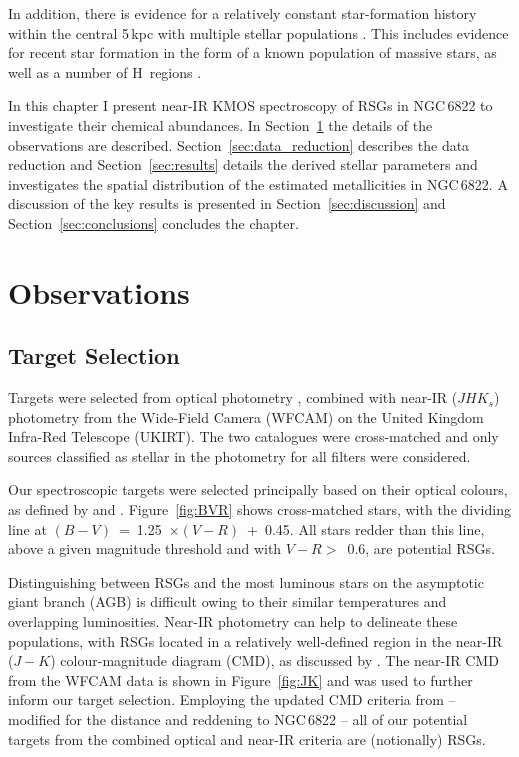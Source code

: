In addition, there is evidence for a relatively constant star-formation history within the central 5\,kpc
\citep{2014ApJ...789..147W}
with multiple stellar populations
\citep{2006A&A...451...99B,2012A&A...540A.135S}.
This includes evidence for recent star formation in the form of a known population of massive stars, as well as a number of H\,\2 regions
\citep{2001ApJ...547..765V,2006AJ....131..343D,2009A&A...505.1027H,2012AJ....144....2L}.

In this chapter I present near-IR KMOS spectroscopy of RSGs in NGC\,6822 to investigate their chemical abundances.
In Section~\ref{sec:observations} the details of the observations are described.
Section~\ref{sec:data_reduction} describes the data reduction and
Section~\ref{sec:results} details the derived stellar parameters and investigates the spatial distribution of the estimated metallicities in NGC\,6822.
A discussion of the key results is presented in Section~\ref{sec:discussion} and
Section~\ref{sec:conclusions} concludes the chapter.


\section{Observations}
\label{sec:observations}

\subsection{Target Selection} %
\label{sub:target_selection}

Targets were selected from optical photometry
\citep{2007AJ....134.2474M}, combined with near-IR ($JHK{_s}$) photometry
\cite[for details see][]{2012A&A...540A.135S} from the Wide-Field Camera (WFCAM) on the United Kingdom Infra-Red Telescope (UKIRT).
The two catalogues were cross-matched and only sources classified as stellar in the photometry for all filters were considered.

Our spectroscopic targets were selected principally based on their optical colours, as defined by
\cite{1998ApJ...501..153M} and
\cite{2012AJ....144....2L}.
Figure~\ref{fig:BVR} shows cross-matched stars, with the dividing line at
$(B - V)$~=~1.25~$\times (V - R)$~+~0.45.
All stars redder than this line, above a given magnitude threshold and with
$V - R >$~0.6, are potential RSGs.

Distinguishing between RSGs and the most luminous stars on the asymptotic giant branch
(AGB) is difficult owing to their similar temperatures and overlapping luminosities.
Near-IR photometry can help to delineate these populations,
with RSGs located in a relatively well-defined region in the near-IR ($J-K$) colour-magnitude diagram (CMD), as discussed by
\cite{2000ApJ...542..804N}.
The near-IR CMD from the WFCAM data is shown in
Figure~\ref{fig:JK} and was used to further inform our target selection.
Employing the updated CMD criteria from
\cite{2014A&A...562A..32C}  -- modified for the distance and reddening to NGC\,6822 --
all of our potential targets from the combined optical and near-IR criteria are (notionally) RSGs.


